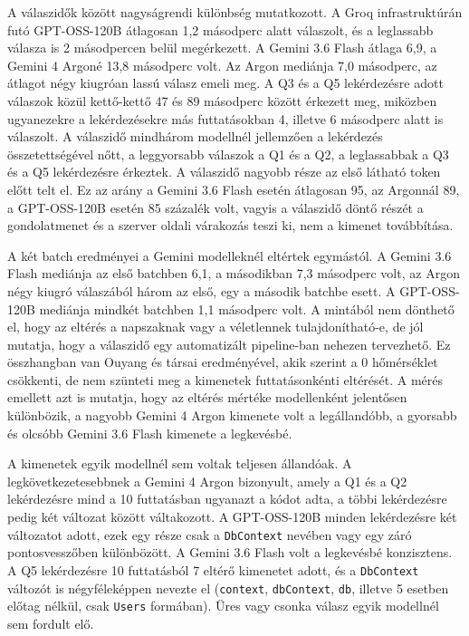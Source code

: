 
A válaszidők között nagyságrendi különbség mutatkozott. A Groq infrastruktúrán futó GPT-OSS-120B átlagosan 1,2 másodperc alatt válaszolt, és a leglassabb válasza is 2 másodpercen belül megérkezett. A Gemini 3.6 Flash átlaga 6,9, a Gemini 4 Argoné 13,8 másodperc volt. Az Argon mediánja 7,0 másodperc, az átlagot négy kiugróan lassú válasz emeli meg. A Q3 és a Q5 lekérdezésre adott válaszok közül kettő-kettő 47 és 89 másodperc között érkezett meg, miközben ugyanezekre a lekérdezésekre más futtatásokban 4, illetve 6 másodperc alatt is válaszolt. A válaszidő mindhárom modellnél jellemzően a lekérdezés összetettségével nőtt, a leggyorsabb válaszok a Q1 és a Q2, a leglassabbak a Q3 és a Q5 lekérdezésre érkeztek. A válaszidő nagyobb része az első látható token előtt telt el. Ez az arány a Gemini 3.6 Flash esetén átlagosan 95, az Argonnál 89, a GPT-OSS-120B esetén 85 százalék volt, vagyis a válaszidő döntő részét a gondolatmenet és a szerver oldali várakozás teszi ki, nem a kimenet továbbítása.

A két batch eredményei a Gemini modelleknél eltértek egymástól. A Gemini 3.6 Flash mediánja az első batchben 6,1, a másodikban 7,3 másodperc volt, az Argon négy kiugró válaszából három az első, egy a második batchbe esett. A GPT-OSS-120B mediánja mindkét batchben 1,1 másodperc volt. A mintából nem dönthető el, hogy az eltérés a napszaknak vagy a véletlennek tulajdonítható-e, de jól mutatja, hogy a válaszidő egy automatizált pipeline-ban nehezen tervezhető. Ez összhangban van Ouyang és társai \cite{ouyang2025nondeterminism} eredményével, akik szerint a 0 hőmérséklet csökkenti, de nem szünteti meg a kimenetek futtatásonkénti eltérését. A mérés emellett azt is mutatja, hogy az eltérés mértéke modellenként jelentősen különbözik, a nagyobb Gemini 4 Argon kimenete volt a legállandóbb, a gyorsabb és olcsóbb Gemini 3.6 Flash kimenete a legkevésbé.

A kimenetek egyik modellnél sem voltak teljesen állandóak. A legkövetkezetesebbnek a Gemini 4 Argon bizonyult, amely a Q1 és a Q2 lekérdezésre mind a 10 futtatásban ugyanazt a kódot adta, a többi lekérdezésre pedig két változat között váltakozott. A GPT-OSS-120B minden lekérdezésre két változatot adott, ezek egy része csak a \texttt{DbContext} nevében vagy egy záró pontosvesszőben különbözött. A Gemini 3.6 Flash volt a legkevésbé konzisztens. A Q5 lekérdezésre 10 futtatásból 7 eltérő kimenetet adott, és a \texttt{DbContext} változót is négyféleképpen nevezte el (\texttt{context}, \texttt{dbContext}, \texttt{db}, illetve 5 esetben előtag nélkül, csak \texttt{Users} formában). Üres vagy csonka válasz egyik modellnél sem fordult elő.

